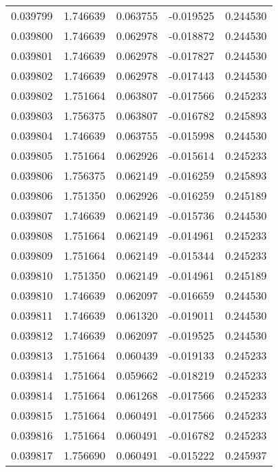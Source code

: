 \begin{tabular}{lrrrr}
0.039799    &  1.746639 &  0.063755 & -0.019525 &             0.244530 \\
0.039800    &  1.746639 &  0.062978 & -0.018872 &             0.244530 \\
0.039801    &  1.746639 &  0.062978 & -0.017827 &             0.244530 \\
0.039802    &  1.746639 &  0.062978 & -0.017443 &             0.244530 \\
0.039802    &  1.751664 &  0.063807 & -0.017566 &             0.245233 \\
0.039803    &  1.756375 &  0.063807 & -0.016782 &             0.245893 \\
0.039804    &  1.746639 &  0.063755 & -0.015998 &             0.244530 \\
0.039805    &  1.751664 &  0.062926 & -0.015614 &             0.245233 \\
0.039806    &  1.756375 &  0.062149 & -0.016259 &             0.245893 \\
0.039806    &  1.751350 &  0.062926 & -0.016259 &             0.245189 \\
0.039807    &  1.746639 &  0.062149 & -0.015736 &             0.244530 \\
0.039808    &  1.751664 &  0.062149 & -0.014961 &             0.245233 \\
0.039809    &  1.751664 &  0.062149 & -0.015344 &             0.245233 \\
0.039810    &  1.751350 &  0.062149 & -0.014961 &             0.245189 \\
0.039810    &  1.746639 &  0.062097 & -0.016659 &             0.244530 \\
0.039811    &  1.746639 &  0.061320 & -0.019011 &             0.244530 \\
0.039812    &  1.746639 &  0.062097 & -0.019525 &             0.244530 \\
0.039813    &  1.751664 &  0.060439 & -0.019133 &             0.245233 \\
0.039814    &  1.751664 &  0.059662 & -0.018219 &             0.245233 \\
0.039814    &  1.751664 &  0.061268 & -0.017566 &             0.245233 \\
0.039815    &  1.751664 &  0.060491 & -0.017566 &             0.245233 \\
0.039816    &  1.751664 &  0.060491 & -0.016782 &             0.245233 \\
0.039817    &  1.756690 &  0.060491 & -0.015222 &             0.245937 \\

\end{tabular}
